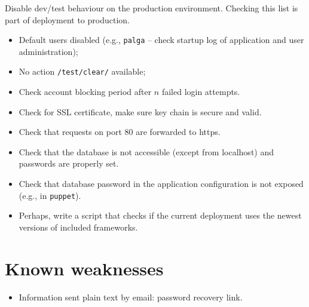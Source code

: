 \documentclass[a4paper]{report}
\begin{document}
Disable dev/test behaviour on the production environment. 
Checking this list is part of deployment to production.
\begin{itemize}
\item Default users disabled (e.g., \texttt{palga} -- check startup log of application and user administration);
\item No action \texttt{/test/clear/} available;
\item Check account blocking period after $n$ failed login attempts.
\item Check for SSL certificate, make sure key chain is secure and valid.
\item Check that requests on port 80 are forwarded to https.
\item Check that the database is not accessible (except from localhost) and passwords are properly set.
\item Check that database password in the application configuration is not exposed (e.g., in \texttt{puppet}).
\item Perhaps, write a script that checks if the current deployment uses the newest versions of included frameworks.
\end{itemize}


\section{Known weaknesses}\label{section:knownproblems}

\begin{itemize}
\item Information sent plain text by email: password recovery link.
\end{itemize}



%

\end{document}

